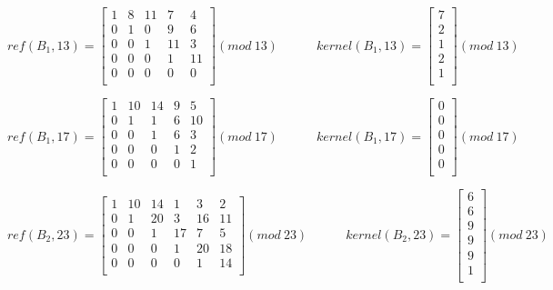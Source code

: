 \documentclass[10pt,a4paper]{report}
\begin{document}
\begin{equation*}
ref(B_1,13)=\begin{bmatrix}
1 & 8 & 11 & 7 & 4 \\
0 & 1 & 0 & 9 & 6\\
0 & 0 & 1 & 11 & 3\\
0 & 0 & 0 & 1 & 11\\
0 & 0 & 0 & 0 & 0\\
\end{bmatrix} (mod \: 13)
\quad \quad \quad
kernel(B_1,13)=\begin{bmatrix}
7\\
2\\
1\\
2\\
1\\
\end{bmatrix} (mod \: 13)
\end{equation*}

\vspace{5mm}

\begin{equation*}
ref(B_1,17)=\begin{bmatrix}
1 & 10 & 14 & 9 & 5 \\
0 & 1 & 1 & 6 & 10\\
0 & 0 & 1 & 6 & 3\\
0 & 0 & 0 & 1 & 2\\
0 & 0 & 0 & 0 & 1\\
\end{bmatrix} (mod \: 17)
\quad \quad \quad
kernel(B_1,17)=\begin{bmatrix}
0\\
0\\
0\\
0\\
0\\
\end{bmatrix} (mod \: 17)
\end{equation*}

\vspace{5mm}

\begin{equation*}
ref(B_2,23)=\begin{bmatrix}
1 & 10 & 14 & 1 & 3 & 2 \\
0 & 1 & 20 & 3 & 16 & 11\\
0 & 0 & 1 & 17 & 7 & 5\\
0 & 0 & 0 & 1 & 20 & 18\\
0 & 0 & 0 & 0 & 1 & 14\\
\end{bmatrix} (mod \: 23)
\quad \quad \quad
kernel(B_2,23)=\begin{bmatrix}
6\\
6\\
9\\
9\\
9\\
1\\
\end{bmatrix} (mod \: 23)
\end{equation*}
\end{document}
